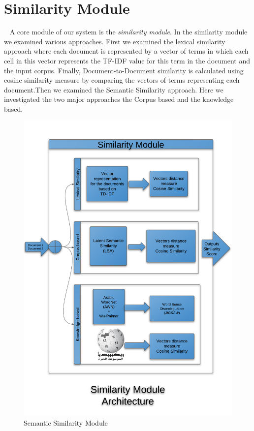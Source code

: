 \section{Similarity Module}~\label{sec:similarity}
A core module of our system is the \textit{similarity module}. In the similarity module we examined various approaches. First we examined the lexical similarity approach where each document is represented by a vector of terms in which each cell in this vector represents the TF-IDF value for this term in the document and the input corpus. 
Finally, Document-to-Document similarity is calculated using cosine similarity measure by comparing the vectors of terms representing each document.Then we examined the Semantic Similarity approach. Here we investigated the two major approaches the Corpus based and the knowledge based.
\begin{figure}[htb]
\begin{center}
\includegraphics[totalheight=.75\textheight,
width=.75\textwidth]{./Figures/Semantic_module.png}
\end{center}
\caption{Semantic Similarity Module}
\label{fig:semanticModule}
\end{figure}

